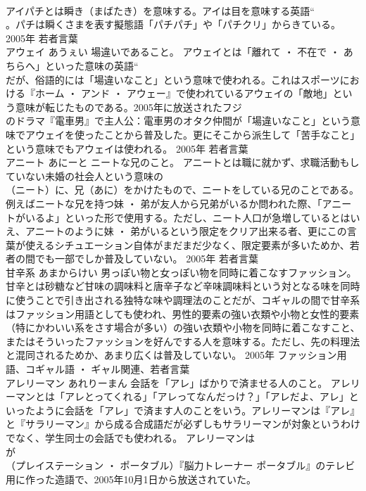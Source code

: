 \documentclass[8pt]{extreport}
\begin{document}
\begin{CJK}{UTF8}{min}
\\	アイパチとは瞬き（まばたき）を意味する。アイは目を意味する英語“
\\	。パチは瞬くさまを表す擬態語「パチパチ」や「パチクリ」からきている。	2005年	若者言葉	
\\	アウェイ	あうぇい	場違いであること。	アウェイとは「離れて ・ 不在で ・ あちらへ」といった意味の英語“
\\	だが、俗語的には「場違いなこと」という意味で使われる。これはスポーツにおける『ホーム ・ アンド ・ アウェー』で使われているアウェイの「敵地」という意味が転じたものである。2005年に放送されたフジ
\\	のドラマ『電車男』で主人公：電車男のオタク仲間が「場違いなこと」という意味でアウェイを使ったことから普及した。更にそこから派生して「苦手なこと」という意味でもアウェイは使われる。	2005年	若者言葉	
\\	アニート	あにーと	ニートな兄のこと。	アニートとは職に就かず、求職活動もしていない未婚の社会人という意味の
\\	（ニート）に、兄（あに）をかけたもので、ニートをしている兄のことである。例えばニートな兄を持つ妹 ・ 弟が友人から兄弟がいるか問われた際、「アニートがいるよ」といった形で使用する。ただし、ニート人口が急増しているとはいえ、アニートのように妹 ・ 弟がいるという限定をクリア出来る者、更にこの言葉が使えるシチュエーション自体がまだまだ少なく、限定要素が多いためか、若者の間でも一部でしか普及していない。	2005年	若者言葉	
\\	甘辛系	あまからけい	男っぽい物と女っぽい物を同時に着こなすファッション。	甘辛とは砂糖など甘味の調味料と唐辛子など辛味調味料という対となる味を同時に使うことで引き出される独特な味や調理法のことだが、コギャルの間で甘辛系はファッション用語としても使われ、男性的要素の強い衣類や小物と女性的要素（特にかわいい系をさす場合が多い）の強い衣類や小物を同時に着こなすこと、またはそういったファッションを好んでする人を意味する。ただし、先の料理法と混同されるためか、あまり広くは普及していない。	2005年	ファッション用語、コギャル語 ・ ギャル関連、若者言葉	
\\	アレリーマン	あれりーまん	会話を「アレ」ばかりで済ませる人のこと。	アレリーマンとは「アレとってくれる」「アレってなんだっけ？」「アレだよ、アレ」といったように会話を「アレ」で済ます人のことをいう。アレリーマンは『アレ』と『サラリーマン』から成る合成語だが必ずしもサラリーマンが対象というわけでなく、学生同士の会話でも使われる。 アレリーマンは
\\	が
\\	（プレイステーション ・ ポータブル）『脳力トレーナー ポータブル』のテレビ
\\	用に作った造語で、2005年10月1日から放送されていた。 

\end{CJK}
\end{document}
